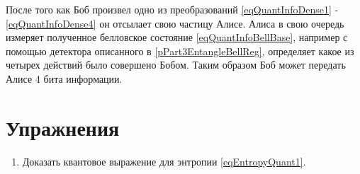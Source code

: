 После того как Боб произвел одно из преобразований
\eqref{eqQuantInfoDense1} - \ref{eqQuantInfoDense4} он отсылает свою
частицу Алисе. Алиса в свою очередь измеряет полученное белловское
состояние \eqref{eqQuantInfoBellBase}, например с помощью детектора
описанного в \ref{pPart3EntangleBellReg}, определяет какое из четырех
действий было совершено Бобом. Таким образом Боб может передать Алисе
4 бита информации.




\section{Упражнения}
\begin{enumerate}
\item Доказать квантовое выражение для энтропии  \eqref{eqEntropyQuant1}.  
\end{enumerate}


